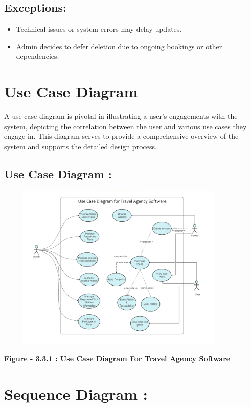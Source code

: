\documentclass{scrreprt}
\begin{document}
\subsection*{\textbf{Exceptions:}}

\begin{itemize}
    \item Technical issues or system errors may delay updates.
    \item Admin decides to defer deletion due to ongoing bookings or other dependencies.
\end{itemize}

\section{Use Case Diagram}

A use case diagram is pivotal in illustrating a user's engagements with the system, depicting the correlation between the user and various use cases they engage in. This diagram serves to provide a comprehensive overview of the system and supports the detailed design process.

\subsection *{ Use Case Diagram : }
{\includegraphics[width=450px, height=300px]{uml.png}}

\begin{center}
    \parbox{0.8\textwidth}{ 
        \centering
        \textbf{Figure - 3.3.1 : Use Case Diagram For Travel Agency Software}
    }
\end{center}

\section{ Sequence Diagram : }
\end{document}
